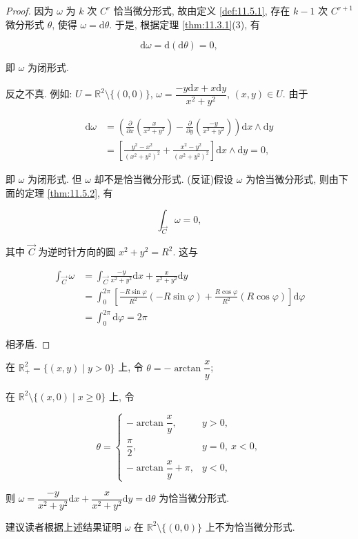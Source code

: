 \begin{proof}

因为 $\omega$ 为 $k$ 次 $C^{r}$ 恰当微分形式, 故由定义 \ref{def:11.5.1}, 存在 $k-1$ 次 $C^{r+1}$ 微分形式 $\theta$, 使得 $\omega=\mathrm{d}\theta$. 于是, 根据定理 \ref{thm:11.3.1}(3), 有

\[
\mathrm{d}\omega=\mathrm{d}(\mathrm{d}\theta)=0,
\]

即 $\omega$ 为闭形式.

反之不真. 例如: $U=\mathbb{R}^{2}\setminus\{(0,0)\}$, $\omega=\dfrac{-y\mathrm{d}x+x\mathrm{d}y}{x^{2}+y^{2}}$, $(x,y)\in U$. 由于

\[
\begin{aligned}
\mathrm{d}\omega&=\left(\frac{\partial}{\partial x}\!\left(\frac{x}{x^{2}+y^{2}}\right)-\frac{\partial}{\partial y}\!\left(\frac{-y}{x^{2}+y^{2}}\right)\right)\mathrm{d}x\wedge\mathrm{d}y\\
&=\left[\frac{y^{2}-x^{2}}{(x^{2}+y^{2})^{2}}+\frac{x^{2}-y^{2}}{(x^{2}+y^{2})^{2}}\right]\mathrm{d}x\wedge\mathrm{d}y=0,
\end{aligned}
\]

即 $\omega$ 为闭形式. 但 $\omega$ 却不是恰当微分形式. (反证)假设 $\omega$ 为恰当微分形式, 则由下面的定理 \ref{thm:11.5.2}, 有

\[
\int_{\overrightarrow{C}}\omega=0,
\]

其中 $\overrightarrow{C}$ 为逆时针方向的圆 $x^{2}+y^{2}=R^{2}$. 这与

\[
\begin{aligned}
\int_{\overrightarrow{C}}\omega
&=\int_{\overrightarrow{C}}\frac{-y}{x^{2}+y^{2}}\mathrm{d}x+\frac{x}{x^{2}+y^{2}}\mathrm{d}y\\
&=\int_{0}^{2\pi}\left[\frac{-R\sin\varphi}{R^{2}}(-R\sin\varphi)
  +\frac{R\cos\varphi}{R^{2}}(R\cos\varphi)\right]\mathrm{d}\varphi\\
&=\int_{0}^{2\pi}\mathrm{d}\varphi=2\pi
\end{aligned}
\]

相矛盾.

\end{proof}

\begin{remark}\label{rem:11.5.1}

在 $\mathbb{R}_{+}^{2}=\{(x,y)\mid y>0\}$ 上, 令 $\theta=-\arctan\dfrac{x}{y}$;

在 $\mathbb{R}^{2}\setminus\{(x,0)\mid x\geqslant0\}$ 上, 令

\[
\theta=\begin{cases}
-\arctan\dfrac{x}{y},&y>0,\\[4pt]
\dfrac{\pi}{2},&y=0,\ x<0,\\[4pt]
-\arctan\dfrac{x}{y}+\pi,&y<0,
\end{cases}
\]

则 $\omega=\dfrac{-y}{x^{2}+y^{2}}\mathrm{d}x+\dfrac{x}{x^{2}+y^{2}}\mathrm{d}y=\mathrm{d}\theta$ 为恰当微分形式.

建议读者根据上述结果证明 $\omega$ 在 $\mathbb{R}^{2}\setminus\{(0,0)\}$ 上不为恰当微分形式.

\end{remark}

